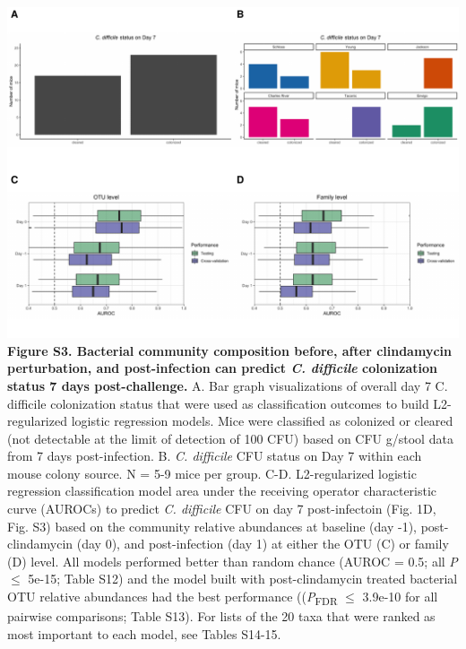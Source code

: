 \documentclass[11pt,]{article}
\begin{document}
\includegraphics{figure_S3.pdf} \textbf{Figure S3. Bacterial community
composition before, after clindamycin perturbation, and post-infection
can predict \emph{C. difficile} colonization status 7 days
post-challenge.} A. Bar graph visualizations of overall day 7 C.
difficile colonization status that were used as classification outcomes
to build L2-regularized logistic regression models. Mice were classified
as colonized or cleared (not detectable at the limit of detection of 100
CFU) based on CFU g/stool data from 7 days post-infection. B. \emph{C.
difficile} CFU status on Day 7 within each mouse colony source. N = 5-9
mice per group. C-D. L2-regularized logistic regression classification
model area under the receiving operator characteristic curve (AUROCs) to
predict \emph{C. difficile} CFU on day 7 post-infectoin (Fig. 1D, Fig.
S3) based on the community relative abundances at baseline (day -1),
post-clindamycin (day 0), and post-infection (day 1) at either the OTU
(C) or family (D) level. All models performed better than random chance
(AUROC = 0.5; all \emph{P} \(\le\) 5e-15; Table S12) and the model built
with post-clindamycin treated bacterial OTU relative abundances had the
best performance ((\emph{P}\textsubscript{FDR} \(\le\) 3.9e-10 for all
pairwise comparisons; Table S13). For lists of the 20 taxa that were
ranked as most important to each model, see Tables S14-15.

\newpage
\end{document}
